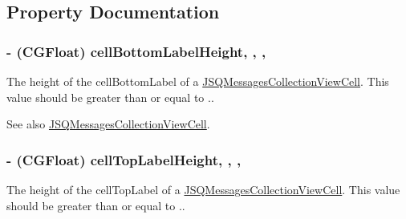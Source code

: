 \subsection{Property Documentation}
\hypertarget{interface_j_s_q_messages_collection_view_layout_attributes_aba6c02585ef9f6d6ce45a58aa178e949}{}
\subsubsection[{cell\+Bottom\+Label\+Height}]{\setlength{\rightskip}{0pt plus 5cm}-\/ (C\+G\+Float) cell\+Bottom\+Label\+Height\hspace{0.3cm}{\ttfamily [read]}, {\ttfamily [write]}, {\ttfamily [nonatomic]}, {\ttfamily [assign]}}\label{interface_j_s_q_messages_collection_view_layout_attributes_aba6c02585ef9f6d6ce45a58aa178e949}
The height of the {\ttfamily cell\+Bottom\+Label} of a {\ttfamily \hyperlink{interface_j_s_q_messages_collection_view_cell}{J\+S\+Q\+Messages\+Collection\+View\+Cell}}. This value should be greater than or equal to {.}.

\begin{DoxySeeAlso}{See also}
\hyperlink{interface_j_s_q_messages_collection_view_cell}{J\+S\+Q\+Messages\+Collection\+View\+Cell}. 
\end{DoxySeeAlso}
\hypertarget{interface_j_s_q_messages_collection_view_layout_attributes_aeab741939de4098a9cae0234e6b49cc3}{}
\subsubsection[{cell\+Top\+Label\+Height}]{\setlength{\rightskip}{0pt plus 5cm}-\/ (C\+G\+Float) cell\+Top\+Label\+Height\hspace{0.3cm}{\ttfamily [read]}, {\ttfamily [write]}, {\ttfamily [nonatomic]}, {\ttfamily [assign]}}\label{interface_j_s_q_messages_collection_view_layout_attributes_aeab741939de4098a9cae0234e6b49cc3}
The height of the {\ttfamily cell\+Top\+Label} of a {\ttfamily \hyperlink{interface_j_s_q_messages_collection_view_cell}{J\+S\+Q\+Messages\+Collection\+View\+Cell}}. This value should be greater than or equal to {.}.

